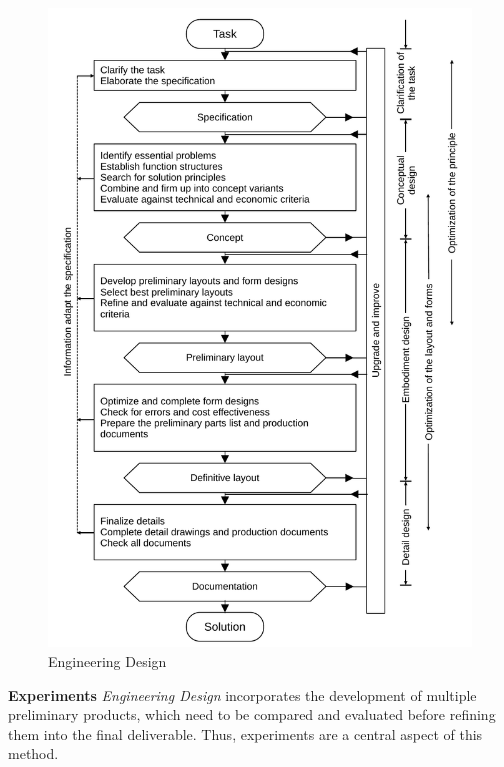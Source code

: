 \begin{figure}[htbp]
  \centering
  \includegraphics[width=\linewidth]{images/2_methodology/design_process}
  \caption[Engineering Design]{Engineering Design~\cite{Dym2012,Pahl1984}}
  \label{fig:engineering_design}
\end{figure}

\textbf{Experiments} \emph{Engineering Design} incorporates the development of
multiple preliminary products, which need to be compared and evaluated before refining
them into the final deliverable. Thus, experiments are a central aspect of this method.


